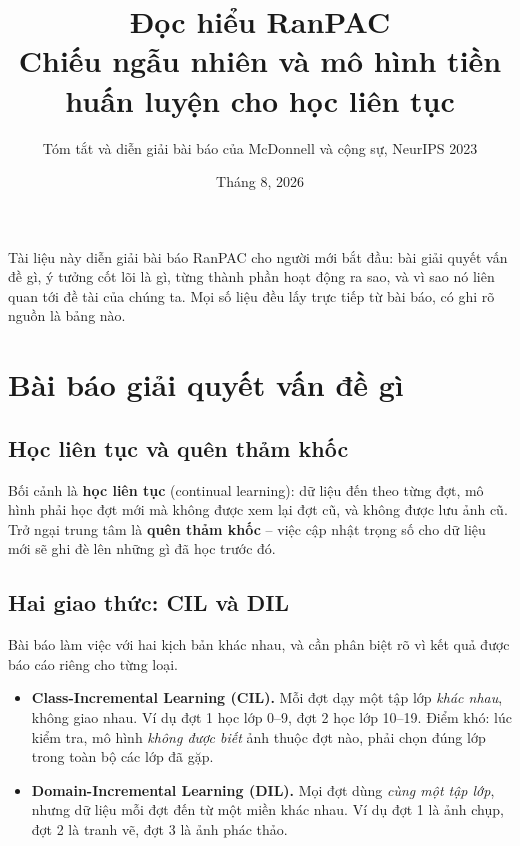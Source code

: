 \documentclass[11pt,a4paper]{article}
\title{\bfseries Đọc hiểu RanPAC\\[2pt]
\large\mdseries Chiếu ngẫu nhiên và mô hình tiền huấn luyện cho học liên tục}
\author{Tóm tắt và diễn giải bài báo của McDonnell và cộng sự, NeurIPS 2023}
\date{Tháng 8, 2026}
\begin{document}
\maketitle

\noindent
Tài liệu này diễn giải bài báo RanPAC \cite{ranpac} cho người mới bắt đầu: bài
giải quyết vấn đề gì, ý tưởng cốt lõi là gì, từng thành phần hoạt động ra sao, và
vì sao nó liên quan tới đề tài của chúng ta. Mọi số liệu đều lấy trực tiếp từ bài
báo, có ghi rõ nguồn là bảng nào.

\tableofcontents
\bigskip

\section{Bài báo giải quyết vấn đề gì}

\subsection{Học liên tục và quên thảm khốc}

Bối cảnh là \textbf{học liên tục} (continual learning): dữ liệu đến theo từng
đợt, mô hình phải học đợt mới mà không được xem lại đợt cũ, và không được lưu ảnh
cũ. Trở ngại trung tâm là \textbf{quên thảm khốc} -- việc cập nhật trọng số cho
dữ liệu mới sẽ ghi đè lên những gì đã học trước đó.

\subsection{Hai giao thức: CIL và DIL}

Bài báo làm việc với hai kịch bản khác nhau, và cần phân biệt rõ vì kết quả được
báo cáo riêng cho từng loại.

\begin{itemize}[leftmargin=*]
\item \textbf{Class-Incremental Learning (CIL).} Mỗi đợt dạy một tập lớp
      \emph{khác nhau}, không giao nhau. Ví dụ đợt 1 học lớp 0--9, đợt 2 học lớp
      10--19. Điểm khó: lúc kiểm tra, mô hình \emph{không được biết} ảnh thuộc
      đợt nào, phải chọn đúng lớp trong toàn bộ các lớp đã gặp.
\item \textbf{Domain-Incremental Learning (DIL).} Mọi đợt dùng \emph{cùng một tập
      lớp}, nhưng dữ liệu mỗi đợt đến từ một miền khác nhau. Ví dụ đợt 1 là ảnh
      chụp, đợt 2 là tranh vẽ, đợt 3 là ảnh phác thảo.
\end{itemize}
\end{document}
